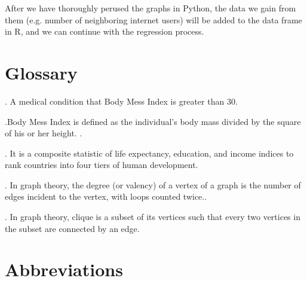 \documentclass[oneside,12pt]{report}
\begin{document}
After we have thoroughly perused the graphs in Python, the data we gain from them (e.g. number of neighboring internet users) will be added to the data frame in R, and we can continue with the regression process.



\appendix
{}


\chapter{Glossary}\label{Glossary}

\vspace{12pt}

\vspace{8pt}
. A medical condition that Body Mess Index is greater than 30.

\vspace{8pt}
.Body Mess Index is defined as the individual's body mass divided by the square of his or her height. .

\vspace{8pt}
. It is a composite statistic of life expectancy, education, and income indices to rank countries into four tiers of human development.

\vspace{8pt} . In graph theory, the degree (or valency) of a vertex of a graph is the number of edges incident to the vertex, with loops counted twice..

\vspace{8pt} . In graph theory, clique is a subset of its vertices such that every two vertices in the subset are connected by an edge.


\chapter{Abbreviations}\label{Abbreviations}
\end{document}

